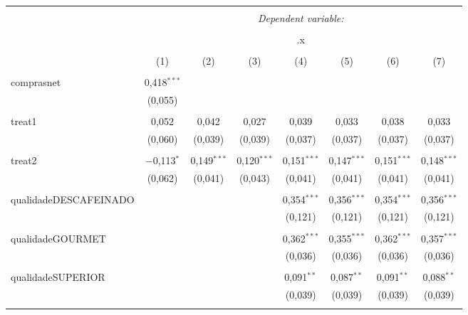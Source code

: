 
\begin{table}[!htbp] \centering 
  \caption{} 
  \label{} 
\begin{tabular}{@{\extracolsep{5pt}}lccccccc} 
\\[-1.8ex]\hline 
\hline \\[-1.8ex] 
 & \multicolumn{7}{c}{\textit{Dependent variable:}} \\ 
\cline{2-8} 
\\[-1.8ex] & \multicolumn{7}{c}{.x} \\ 
\\[-1.8ex] & (1) & (2) & (3) & (4) & (5) & (6) & (7)\\ 
\hline \\[-1.8ex] 
 comprasnet & 0,418$^{***}$ &  &  &  &  &  &  \\ 
  & (0,055) &  &  &  &  &  &  \\ 
  & & & & & & & \\ 
 treat1 & 0,052 & 0,042 & 0,027 & 0,039 & 0,033 & 0,038 & 0,033 \\ 
  & (0,060) & (0,039) & (0,039) & (0,037) & (0,037) & (0,037) & (0,037) \\ 
  & & & & & & & \\ 
 treat2 & $-$0,113$^{*}$ & 0,149$^{***}$ & 0,120$^{***}$ & 0,151$^{***}$ & 0,147$^{***}$ & 0,151$^{***}$ & 0,148$^{***}$ \\ 
  & (0,062) & (0,041) & (0,043) & (0,041) & (0,041) & (0,041) & (0,041) \\ 
  & & & & & & & \\ 
 qualidadeDESCAFEINADO &  &  &  & 0,354$^{***}$ & 0,356$^{***}$ & 0,354$^{***}$ & 0,356$^{***}$ \\ 
  &  &  &  & (0,121) & (0,121) & (0,121) & (0,121) \\ 
  & & & & & & & \\ 
 qualidadeGOURMET &  &  &  & 0,362$^{***}$ & 0,355$^{***}$ & 0,362$^{***}$ & 0,357$^{***}$ \\ 
  &  &  &  & (0,036) & (0,036) & (0,036) & (0,036) \\ 
  & & & & & & & \\ 
 qualidadeSUPERIOR &  &  &  & 0,091$^{**}$ & 0,087$^{**}$ & 0,091$^{**}$ & 0,088$^{**}$ \\ 
  &  &  &  & (0,039) & (0,039) & (0,039) & (0,039) \\ 
  & & & & & & & \\ 

\end{tabular}
\end{table}
